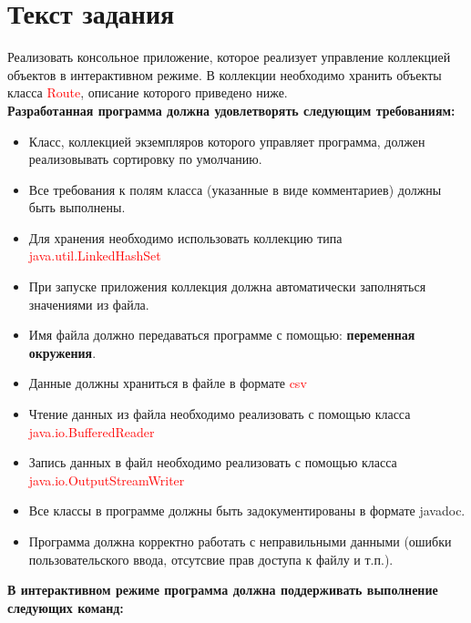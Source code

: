 \documentclass[12pt,onecolumn]{article}
\begin{document}
\section{Текст задания}
Реализовать консольное приложение, которое реализует управление коллекцией объектов в интерактивном режиме. В коллекции необходимо хранить объекты класса \textcolor{red}{Route}, описание которого приведено ниже.\\
\textbf{Разработанная программа должна удовлетворять следующим требованиям:}
\begin{itemize}
    \item Класс, коллекцией экземпляров которого управляет программа, должен реализовывать сортировку по умолчанию.
    \item Все требования к полям класса (указанные в виде комментариев) должны быть выполнены.
    \item Для хранения необходимо использовать коллекцию типа \textcolor{red}{java.util.LinkedHashSet}
    \item При запуске приложения коллекция должна автоматически заполняться значениями из файла.
    \item Имя файла должно передаваться программе с помощью: \textbf{переменная окружения}.
    \item Данные должны храниться в файле в формате \textcolor{red}{csv}
    \item Чтение данных из файла необходимо реализовать с помощью класса \textcolor{red}{java.io.BufferedReader}
    \item Запись данных в файл необходимо реализовать с помощью класса \textcolor{red}{java.io.OutputStreamWriter}
    \item Все классы в программе должны быть задокументированы в формате javadoc.
    \item Программа должна корректно работать с неправильными данными (ошибки пользовательского ввода, отсутсвие прав доступа к файлу и т.п.).
\end{itemize}
\textbf{В интерактивном режиме программа должна поддерживать выполнение следующих команд:}
\end{document}
